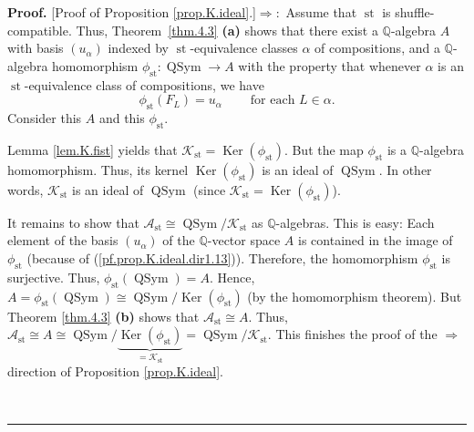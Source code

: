 \documentclass[numbers=enddot,12pt,final,onecolumn,notitlepage]{scrartcl}%
\theoremstyle{definition}
\newenvironment{proof}[1][Proof]{\noindent\textbf{#1.} }{\ \rule{0.5em}{0.5em}}
\newenvironment{verlong}{}{}
\begin{document}
\begin{verlong}
\begin{proof}
[Proof of Proposition \ref{prop.K.ideal}.]$\Longrightarrow:$ Assume that
$\operatorname{st}$ is shuffle-compatible. Thus, Theorem~\ref{thm.4.3}
\textbf{(a)} shows that there exist a $\mathbb{Q}$-algebra $A$ with basis
$\left(  u_{\alpha}\right)  $ indexed by $\operatorname{st}$-equivalence
classes $\alpha$ of compositions, and a $\mathbb{Q}$-algebra homomorphism
$\phi_{\operatorname{st}}:\operatorname*{QSym}\rightarrow A$ with the
property that whenever $\alpha$ is an $\operatorname{st}$-equivalence class
of compositions, we have%
\begin{equation}
\phi_{\operatorname{st}}\left(  F_{L}\right)  =u_{\alpha}%
\ \ \ \ \ \ \ \ \ \ \text{for each }L\in\alpha.
\label{pf.prop.K.ideal.dir1.13}%
\end{equation}
Consider this $A$ and this $\phi_{\operatorname{st}}$.

Lemma \ref{lem.K.fist} yields that $\mathcal{K}_{\operatorname{st}}
=\operatorname*{Ker}\left(  \phi_{\operatorname{st}}\right)  $. But the map
$\phi_{\operatorname{st}}$ is a $\mathbb{Q}$-algebra homomorphism. Thus, its
kernel $\operatorname*{Ker}\left(  \phi_{\operatorname{st}}\right)  $ is an
ideal of $\operatorname*{QSym}$. In other words, $\mathcal{K}%
_{\operatorname{st}}$ is an ideal of $\operatorname*{QSym}$ (since
$\mathcal{K}_{\operatorname{st}}=\operatorname*{Ker}\left(  \phi
_{\operatorname{st}}\right)  $).

It remains to show that $\mathcal{A}_{\operatorname{st}}\cong%
\operatorname*{QSym}/\mathcal{K}_{\operatorname{st}}$ as $\mathbb{Q}$-algebras.
This is easy: Each
element of the basis $\left(  u_{\alpha}\right)  $ of the $\mathbb{Q}$-vector
space $A$ is contained in the image of $\phi_{\operatorname{st}}$ (because of
(\ref{pf.prop.K.ideal.dir1.13})). Therefore, the homomorphism $\phi
_{\operatorname{st}}$ is surjective. Thus, $\phi_{\operatorname{st}}\left(
\operatorname*{QSym}\right)  =A$. Hence, $A=\phi_{\operatorname{st}}\left(
\operatorname*{QSym}\right)  \cong\operatorname*{QSym}/\operatorname*{Ker}%
\left(  \phi_{\operatorname{st}}\right)  $ (by the homomorphism theorem). But
Theorem \ref{thm.4.3} \textbf{(b)} shows that
$\mathcal{A}_{\operatorname{st}}\cong A$.
Thus, $\mathcal{A}_{\operatorname{st}}\cong A\cong
\operatorname*{QSym}/\underbrace{\operatorname*{Ker}\left(  \phi
_{\operatorname{st}}\right)  }_{=\mathcal{K}_{\operatorname{st}}%
}=\operatorname*{QSym}/\mathcal{K}_{\operatorname{st}}$. This finishes the
proof of the $\Longrightarrow$ direction of Proposition \ref{prop.K.ideal}.


\end{proof}
\end{verlong}
\end{document}
